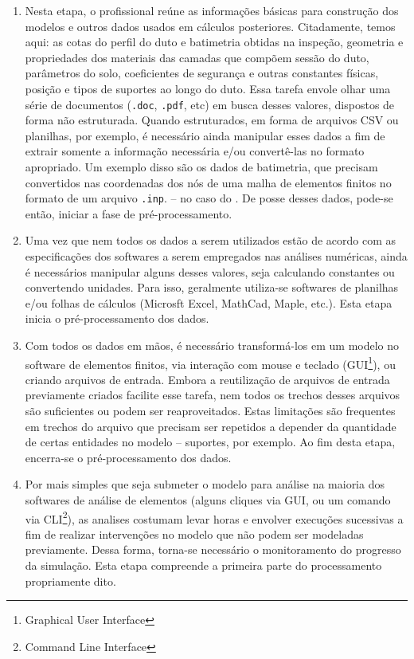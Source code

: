 \begin{enumerate}[label=(\arabic*)]
    \item Nesta etapa, o profissional reúne as informações básicas para construção dos modelos e outros dados usados em cálculos posteriores. Citadamente, temos aqui: as cotas do perfil do duto e batimetria obtidas na inspeção, geometria e propriedades dos materiais das camadas que compõem sessão do duto, parâmetros do solo, coeficientes de segurança e outras constantes físicas, posição e tipos de suportes ao longo do duto. Essa tarefa envole olhar uma série de documentos (\texttt{.doc}, \texttt{.pdf}, etc) em busca desses valores, dispostos de forma não estruturada. Quando estruturados, em forma de arquivos CSV ou planilhas, por exemplo, é necessário ainda manipular esses dados a fim de extrair somente a informação necessária e/ou convertê-las no formato apropriado. Um exemplo disso são os dados de batimetria, que precisam convertidos nas coordenadas dos nós de uma malha de elementos finitos no formato de um arquivo \texttt{.inp}. -- no caso do \abaqus. De posse desses dados, pode-se então, iniciar a fase de pré-processamento.
    \item Uma vez que nem todos os dados a serem utilizados estão de acordo com as especificações dos softwares a serem empregados nas análises numéricas, ainda é necessários manipular alguns desses valores, seja calculando constantes ou convertendo unidades. Para isso, geralmente utiliza-se softwares de planilhas e/ou folhas de cálculos (Microsft Excel, MathCad, Maple, etc.). Esta etapa inicia o pré-processamento dos dados.
    \item Com todos os dados em mãos, é necessário transformá-los em um modelo no software de elementos finitos, via interação com mouse e teclado (GUI\footnote{Graphical User Interface}), ou criando arquivos de entrada. Embora a reutilização de arquivos de entrada previamente criados facilite esse tarefa, nem todos os trechos desses arquivos são suficientes ou podem ser reaproveitados. Estas limitações são frequentes em trechos do arquivo que precisam ser repetidos a depender da quantidade de certas entidades no modelo -- suportes, por exemplo. Ao fim desta etapa, encerra-se o pré-processamento dos dados.
    \item Por mais simples que seja submeter o modelo para análise na maioria dos softwares de análise de elementos (alguns cliques via GUI, ou um comando via CLI\footnote{Command Line Interface}), as analises costumam levar horas e envolver execuções sucessivas a fim de realizar intervenções no modelo que não podem ser modeladas previamente. Dessa forma, torna-se necessário o monitoramento do progresso da simulação. Esta etapa compreende a primeira parte do processamento propriamente dito.

\end{enumerate}
